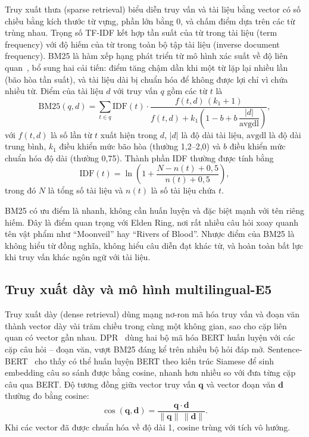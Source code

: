 Truy xuất thưa (sparse retrieval) biểu diễn truy vấn và tài liệu bằng vector có số chiều bằng kích thước từ vựng, phần lớn bằng 0, và chấm điểm dựa trên các từ trùng nhau. Trọng số TF-IDF kết hợp tần suất của từ trong tài liệu (term frequency) với độ hiếm của từ trong toàn bộ tập tài liệu (inverse document frequency). BM25 là hàm xếp hạng phát triển từ mô hình xác suất về độ liên quan~\cite{robertson2009bm25}, bổ sung hai cải tiến: điểm tăng chậm dần khi một từ lặp lại nhiều lần (bão hòa tần suất), và tài liệu dài bị chuẩn hóa để không được lợi chỉ vì chứa nhiều từ. Điểm của tài liệu $d$ với truy vấn $q$ gồm các từ $t$ là
\begin{equation}
    \mathrm{BM25}(q, d) = \sum_{t \in q} \mathrm{IDF}(t)\cdot
    \frac{f(t, d)\,(k_1 + 1)}{f(t, d) + k_1\left(1 - b + b\,\dfrac{|d|}{\mathrm{avgdl}}\right)},
    \label{eq:bm25}
\end{equation}
với $f(t,d)$ là số lần từ $t$ xuất hiện trong $d$, $|d|$ là độ dài tài liệu, $\mathrm{avgdl}$ là độ dài trung bình, $k_1$ điều khiển mức bão hòa (thường 1,2--2,0) và $b$ điều khiển mức chuẩn hóa độ dài (thường 0,75). Thành phần IDF thường được tính bằng
\begin{equation}
    \mathrm{IDF}(t) = \ln\!\left(1 + \frac{N - n(t) + 0{,}5}{n(t) + 0{,}5}\right),
    \label{eq:idf}
\end{equation}
trong đó $N$ là tổng số tài liệu và $n(t)$ là số tài liệu chứa $t$.

BM25 có ưu điểm là nhanh, không cần huấn luyện và đặc biệt mạnh với tên riêng hiếm. Đây là điểm quan trọng với Elden Ring, nơi rất nhiều câu hỏi xoay quanh tên vật phẩm như ``Moonveil'' hay ``Rivers of Blood''. Nhược điểm của BM25 là không hiểu từ đồng nghĩa, không hiểu câu diễn đạt khác từ, và hoàn toàn bất lực khi truy vấn khác ngôn ngữ với tài liệu.

\subsection{Truy xuất dày và mô hình multilingual-E5}
\label{sec:dense}

Truy xuất dày (dense retrieval) dùng mạng nơ-ron mã hóa truy vấn và đoạn văn thành vector dày vài trăm chiều trong cùng một không gian, sao cho cặp liên quan có vector gần nhau. DPR~\cite{karpukhin2020dpr} dùng hai bộ mã hóa BERT huấn luyện với các cặp câu hỏi -- đoạn văn, vượt BM25 đáng kể trên nhiều bộ hỏi đáp mở. Sentence-BERT~\cite{reimers2019sbert} cho thấy có thể huấn luyện BERT theo kiến trúc Siamese để sinh embedding câu so sánh được bằng cosine, nhanh hơn nhiều so với đưa từng cặp câu qua BERT. Độ tương đồng giữa vector truy vấn $\mathbf{q}$ và vector đoạn văn $\mathbf{d}$ thường đo bằng cosine:
\begin{equation}
    \cos(\mathbf{q}, \mathbf{d}) = \frac{\mathbf{q}\cdot\mathbf{d}}{\lVert\mathbf{q}\rVert\,\lVert\mathbf{d}\rVert}.
    \label{eq:cosine}
\end{equation}
Khi các vector đã được chuẩn hóa về độ dài 1, cosine trùng với tích vô hướng.

